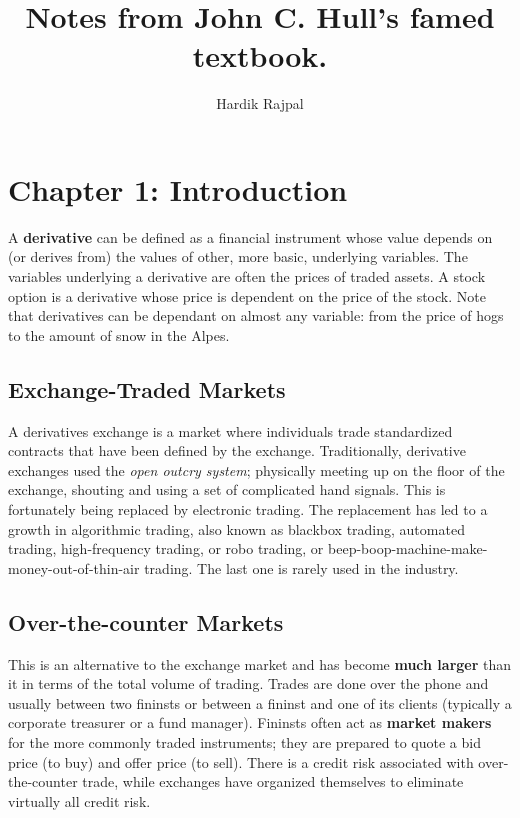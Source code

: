 \documentclass{article}
\author{Hardik Rajpal}
\title{Notes from John C. Hull's famed textbook.}
\begin{document}
\maketitle
\section{Chapter 1: Introduction}
A \textbf{derivative} can be defined as a financial instrument whose value depends on (or
derives from) the values of other, more basic, underlying variables. The variables 
underlying a derivative are often the prices of traded assets. A stock option is a
derivative whose price is dependent on the price of the stock. Note that derivatives
can be dependant on almost any variable: from the price of hogs to the amount
of snow in the Alpes.
\subsection{Exchange-Traded Markets}
A derivatives exchange is a market where individuals trade standardized contracts that
have been defined by the exchange. Traditionally, derivative exchanges used the 
\emph{open outcry system}; physically meeting up on the floor of the exchange, shouting
and using a set of complicated hand signals. This is fortunately being replaced by
electronic trading. The replacement has led to a growth in algorithmic trading,
also known as blackbox trading, automated trading, high-frequency trading, or robo trading,
or beep-boop-machine-make-money-out-of-thin-air trading. The last one is rarely used in
the industry.
\subsection{Over-the-counter Markets}
This is an alternative to the exchange market and has become \textbf{much larger} than it in terms
of the total volume of trading. Trades are done over the phone and usually between
two fininsts or between a fininst and one of its clients (typically a corporate treasurer
or a fund manager). Fininsts often act as \textbf{market makers} for the more commonly
traded instruments; they are prepared to quote a bid price (to buy) and offer price (to sell).
There is a credit risk associated with over-the-counter trade, while exchanges have
organized themselves to eliminate virtually all credit risk.
\end{document}
